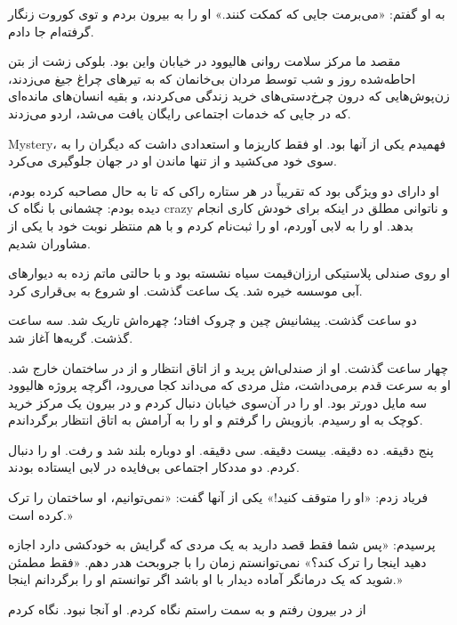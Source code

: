 به او گفتم: «می‌برمت جایی که کمکت کنند.» او را به بیرون بردم و توی کوروت زنگار گرفته‌ام جا دادم.

مقصد ما مرکز سلامت روانی هالیوود در خیابان واین بود. بلوکی زشت از بتن احاطه‌شده روز و شب توسط مردان بی‌خانمان که به تیرهای چراغ جیغ می‌زدند، زن‌پوش‌هایی که درون چرخ‌دستی‌های خرید زندگی می‌کردند، و بقیه انسان‌های مانده‌ای که در جایی که خدمات اجتماعی رایگان یافت می‌شد، اردو می‌زدند.

Mystery، فهمیدم یکی از آنها بود. او فقط کاریزما و استعدادی داشت که دیگران را به سوی خود می‌کشید و از تنها ماندن او در جهان جلوگیری می‌کرد.

او دارای دو ویژگی بود که تقریباً در هر ستاره راکی که تا به حال مصاحبه کرده بودم، دیده بودم: چشمانی با نگاه ک crazy و ناتوانی مطلق در اینکه برای خودش کاری انجام بدهد. او را به لابی آوردم، او را ثبت‌نام کردم و با هم منتظر نوبت خود با یکی از مشاوران شدیم.

او روی صندلی پلاستیکی ارزان‌قیمت سیاه نشسته بود و با حالتی ماتم زده به دیوارهای آبی موسسه خیره شد. یک ساعت گذشت. او شروع به بی‌قراری کرد.

دو ساعت گذشت. پیشانیش چین و چروک افتاد؛ چهره‌اش تاریک شد. سه ساعت گذشت. گریه‌ها آغاز شد.

چهار ساعت گذشت. او از صندلی‌اش پرید و از اتاق انتظار و از در ساختمان خارج شد. او به سرعت قدم برمی‌داشت، مثل مردی که می‌داند کجا می‌رود، اگرچه پروژه هالیوود سه مایل دورتر بود. او را در آن‌سوی خیابان دنبال کردم و در بیرون یک مرکز خرید کوچک به او رسیدم. بازویش را گرفتم و او را به آرامش به اتاق انتظار برگرداندم.

پنج دقیقه. ده دقیقه. بیست دقیقه. سی دقیقه. او دوباره بلند شد و رفت. او را دنبال کردم. دو مددکار اجتماعی بی‌فایده در لابی ایستاده بودند.

فریاد زدم: «او را متوقف کنید!» یکی از آنها گفت: «نمی‌توانیم، او ساختمان را ترک کرده است.»

پرسیدم: «پس شما فقط قصد دارید به یک مردی که گرایش به خودکشی دارد اجازه دهید اینجا را ترک کند؟» نمی‌توانستم زمان را با جروبحث هدر دهم. «فقط مطمئن شوید که یک درمانگر آماده دیدار با او باشد اگر توانستم او را برگردانم اینجا.»

از در بیرون رفتم و به سمت راستم نگاه کردم. او آنجا نبود. نگاه کردم